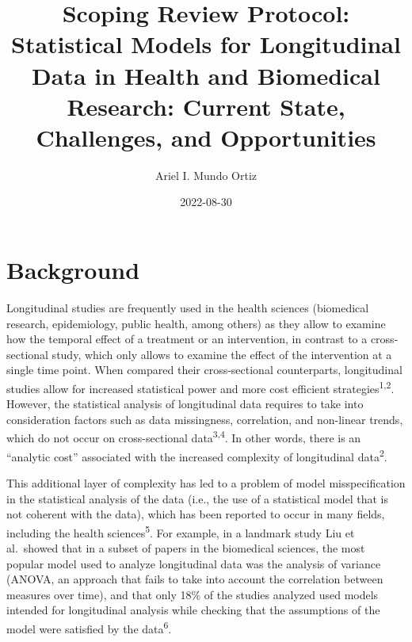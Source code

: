 \documentclass[
]{article}
\title{Scoping Review Protocol: Statistical Models for Longitudinal Data
in Health and Biomedical Research: Current State, Challenges, and
Opportunities}
\author{Ariel I. Mundo Ortiz}
\date{2022-08-30}
\renewcommand*\contentsname{Table of contents}
\newcommand\contentsname{Table of contents}
\begin{document}
\maketitle
\ifdefined\Shaded\renewenvironment{Shaded}{\begin{tcolorbox}[frame hidden, borderline west={3pt}{0pt}{shadecolor}, enhanced, boxrule=0pt, interior hidden, breakable, sharp corners]}{\end{tcolorbox}}\fi

\renewcommand*\contentsname{Table of contents}
{
\hypersetup{linkcolor=}
\setcounter{tocdepth}{3}
\tableofcontents
}
\hypertarget{background}{%
\section{Background}\label{background}}

Longitudinal studies are frequently used in the health sciences
(biomedical research, epidemiology, public health, among others) as they
allow to examine how the temporal effect of a treatment or an
intervention, in contrast to a cross-sectional study, which only allows
to examine the effect of the intervention at a single time point. When
compared their cross-sectional counterparts, longitudinal studies allow
for increased statistical power and more cost efficient
strategies\textsuperscript{1,2}. However, the statistical analysis of
longitudinal data requires to take into consideration factors such as
data missingness, correlation, and non-linear trends, which do not occur
on cross-sectional data\textsuperscript{3,4}. In other words, there is
an ``analytic cost'' associated with the increased complexity of
longitudinal data\textsuperscript{2}.

This additional layer of complexity has led to a problem of model
misspecification in the statistical analysis of the data (i.e., the use
of a statistical model that is not coherent with the data), which has
been reported to occur in many fields, including the health
sciences\textsuperscript{5}. For example, in a landmark study Liu et
al.~showed that in a subset of papers in the biomedical sciences, the
most popular model used to analyze longitudinal data was the analysis of
variance (ANOVA, an approach that fails to take into account the
correlation between measures over time), and that only 18\% of the
studies analyzed used models intended for longitudinal analysis while
checking that the assumptions of the model were satisfied by the
data\textsuperscript{6}.
\end{document}

